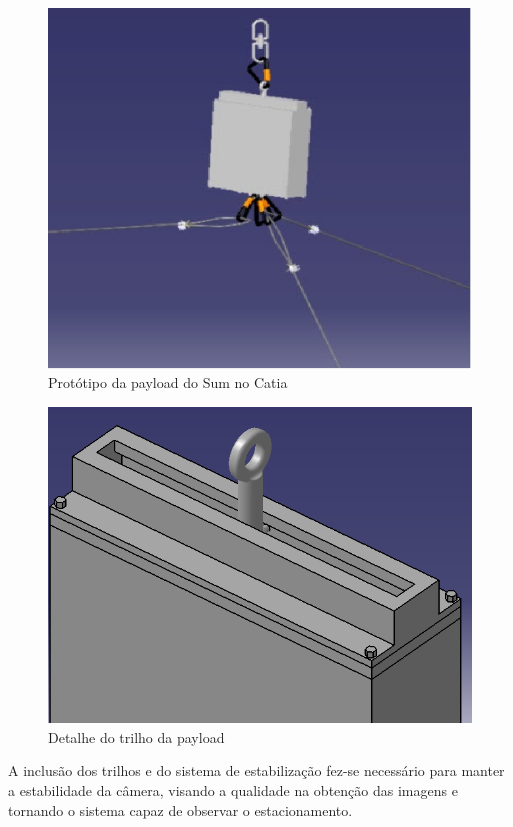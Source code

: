 \begin{figure}[htp]
	\centering
	\includegraphics[scale=0.50]{figuras/catiadopayload}
	\caption{Protótipo da payload do Sum no Catia}
	\label{img: Protótipo da payload do Sum no Catia}
	\end{figure}
	
\begin{figure}[htp]
	\centering
	\includegraphics[scale=0.50]{figuras/catiadafixacao}
	\caption{Detalhe do trilho da payload}
	\label{img: Detalhe do trilho da payload}
\end{figure}

A inclusão dos trilhos e do sistema de estabilização fez-se necessário para manter a estabilidade da câmera, visando a qualidade na obtenção das imagens e tornando o sistema capaz de observar o estacionamento.

